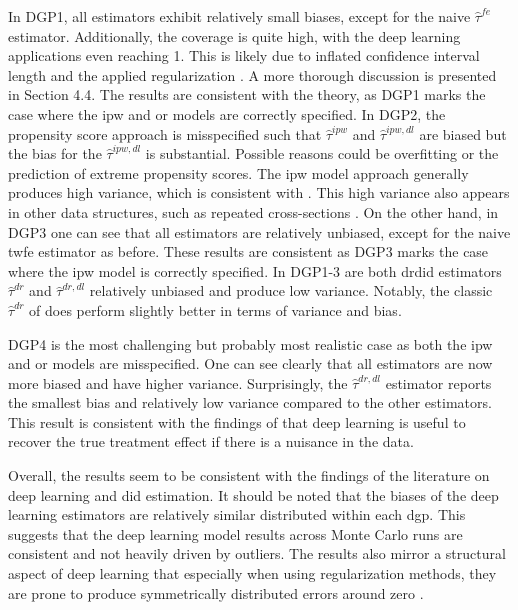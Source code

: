 In DGP1, all estimators exhibit relatively small biases, except for the naive $\hat{\tau}^{fe}$ estimator.
Additionally, the coverage is quite high, with the deep learning applications even reaching 1.
This is likely due to inflated confidence interval length and the applied regularization \citep{farrellDeepNeuralNetworks2021}.
A more thorough discussion is presented in Section 4.4.
The results are consistent with the theory, as DGP1 marks the case where the \ac{ipw} and \ac{or} models are correctly specified.
In DGP2, the propensity score approach is misspecified such that $\hat{\tau}^{ipw}$ and $\hat{\tau}^{ipw,dl}$ are biased but the bias for the  $\hat{\tau}^{ipw,dl}$ is substantial.
Possible reasons could be overfitting or the prediction of extreme propensity scores.
The \ac{ipw} model approach generally produces high variance, which is consistent with \citet{santannaDoublyRobustDifferenceindifferences2020}.
This high variance also appears in other data structures, such as repeated cross-sections \citep{santannaDoublyRobustDifferenceindifferences2020, manfeDifferenceInDifferenceDesignRepeated}.
On the other hand, in DGP3 one can see that all estimators are relatively unbiased, except for the naive \ac{twfe} estimator as before.
These results are consistent as DGP3 marks the case where the \ac{ipw} model is correctly specified.
In DGP1-3 are both \ac{drdid} estimators $\hat{\tau}^{dr}$ and $\hat{\tau}^{dr,dl}$ relatively unbiased and produce low variance.
Notably, the classic $\hat{\tau}^{dr}$ of \citet{santannaDoublyRobustDifferenceindifferences2020} does perform slightly better in terms of variance and bias.

DGP4 is the most challenging but probably most realistic case as both the \ac{ipw} and \ac{or} models are misspecified.
One can see clearly that all estimators are now more biased and have higher variance.
Surprisingly, the $\hat{\tau}^{dr,dl}$ estimator reports the smallest bias and relatively low variance compared to the other estimators.
This result is consistent with the findings of \citet{belloni2017program,chernozhukovDoubleDebiasedMachine2018,farrellDeepNeuralNetworks2021} that deep learning is useful to recover the true treatment effect if there is a nuisance in the data.



Overall, the results seem to be consistent with the findings of the literature on deep learning and \ac{did} estimation.
It should be noted that the biases of the deep learning estimators are relatively similar distributed within each \ac{dgp}.
This suggests that the deep learning model results across Monte Carlo runs are consistent and not heavily driven by outliers.
The results also mirror a structural aspect of deep learning that especially when using regularization methods, they are prone to produce symmetrically distributed errors around zero \citep{koh2017understanding}.

